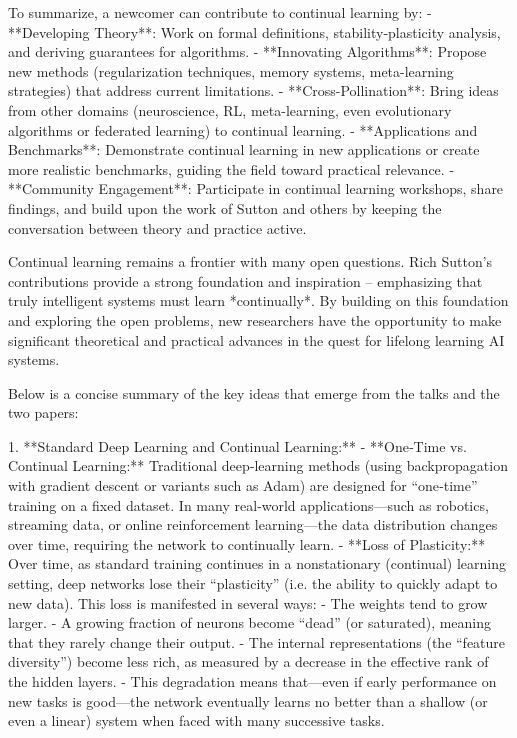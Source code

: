 To summarize, a newcomer can contribute to continual learning by:
- **Developing Theory**: Work on formal definitions, stability-plasticity analysis, and deriving guarantees for algorithms.
- **Innovating Algorithms**: Propose new methods (regularization techniques, memory systems, meta-learning strategies) that address current limitations.
- **Cross-Pollination**: Bring ideas from other domains (neuroscience, RL, meta-learning, even evolutionary algorithms or federated learning) to continual learning.
- **Applications and Benchmarks**: Demonstrate continual learning in new applications or create more realistic benchmarks, guiding the field toward practical relevance.
- **Community Engagement**: Participate in continual learning workshops, share findings, and build upon the work of Sutton and others by keeping the conversation between theory and practice active.

Continual learning remains a frontier with many open questions. Rich Sutton’s contributions provide a strong foundation and inspiration – emphasizing that truly intelligent systems must learn *continually*. By building on this foundation and exploring the open problems, new researchers have the opportunity to make significant theoretical and practical advances in the quest for lifelong learning AI systems. 


Below is a concise summary of the key ideas that emerge from the talks and the two papers:

1. **Standard Deep Learning and Continual Learning:**
   - **One‐Time vs. Continual Learning:** Traditional deep‐learning methods (using backpropagation with gradient descent or variants such as Adam) are designed for “one‐time” training on a fixed dataset. In many real‐world applications—such as robotics, streaming data, or online reinforcement learning—the data distribution changes over time, requiring the network to continually learn.
   - **Loss of Plasticity:** Over time, as standard training continues in a nonstationary (continual) learning setting, deep networks lose their “plasticity” (i.e. the ability to quickly adapt to new data). This loss is manifested in several ways:
     - The weights tend to grow larger.
     - A growing fraction of neurons become “dead” (or saturated), meaning that they rarely change their output.
     - The internal representations (the “feature diversity”) become less rich, as measured by a decrease in the effective rank of the hidden layers.
   - This degradation means that—even if early performance on new tasks is good—the network eventually learns no better than a shallow (or even a linear) system when faced with many successive tasks.

